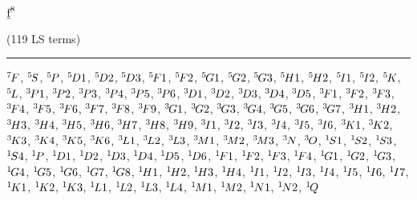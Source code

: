 \begin{mdframed}
\begin{center}
$\underbar{$\text{f}$}^{8}$

(119 LS terms)
\vspace{0.25cm}
\hrule
\vspace{0.25cm}

${}^{7}{\kern-0.1em}{F}$, ${}^{5}{\kern-0.1em}{S}$, ${}^{5}{\kern-0.1em}{P}$, ${}^{5}{\kern-0.1em}{D1}$, ${}^{5}{\kern-0.1em}{D2}$, ${}^{5}{\kern-0.1em}{D3}$, ${}^{5}{\kern-0.1em}{F1}$, ${}^{5}{\kern-0.1em}{F2}$, ${}^{5}{\kern-0.1em}{G1}$, ${}^{5}{\kern-0.1em}{G2}$, ${}^{5}{\kern-0.1em}{G3}$, ${}^{5}{\kern-0.1em}{H1}$, ${}^{5}{\kern-0.1em}{H2}$, ${}^{5}{\kern-0.1em}{I1}$, ${}^{5}{\kern-0.1em}{I2}$, ${}^{5}{\kern-0.1em}{K}$, ${}^{5}{\kern-0.1em}{L}$, ${}^{3}{\kern-0.1em}{P1}$, ${}^{3}{\kern-0.1em}{P2}$, ${}^{3}{\kern-0.1em}{P3}$, ${}^{3}{\kern-0.1em}{P4}$, ${}^{3}{\kern-0.1em}{P5}$, ${}^{3}{\kern-0.1em}{P6}$, ${}^{3}{\kern-0.1em}{D1}$, ${}^{3}{\kern-0.1em}{D2}$, ${}^{3}{\kern-0.1em}{D3}$, ${}^{3}{\kern-0.1em}{D4}$, ${}^{3}{\kern-0.1em}{D5}$, ${}^{3}{\kern-0.1em}{F1}$, ${}^{3}{\kern-0.1em}{F2}$, ${}^{3}{\kern-0.1em}{F3}$, ${}^{3}{\kern-0.1em}{F4}$, ${}^{3}{\kern-0.1em}{F5}$, ${}^{3}{\kern-0.1em}{F6}$, ${}^{3}{\kern-0.1em}{F7}$, ${}^{3}{\kern-0.1em}{F8}$, ${}^{3}{\kern-0.1em}{F9}$, ${}^{3}{\kern-0.1em}{G1}$, ${}^{3}{\kern-0.1em}{G2}$, ${}^{3}{\kern-0.1em}{G3}$, ${}^{3}{\kern-0.1em}{G4}$, ${}^{3}{\kern-0.1em}{G5}$, ${}^{3}{\kern-0.1em}{G6}$, ${}^{3}{\kern-0.1em}{G7}$, ${}^{3}{\kern-0.1em}{H1}$, ${}^{3}{\kern-0.1em}{H2}$, ${}^{3}{\kern-0.1em}{H3}$, ${}^{3}{\kern-0.1em}{H4}$, ${}^{3}{\kern-0.1em}{H5}$, ${}^{3}{\kern-0.1em}{H6}$, ${}^{3}{\kern-0.1em}{H7}$, ${}^{3}{\kern-0.1em}{H8}$, ${}^{3}{\kern-0.1em}{H9}$, ${}^{3}{\kern-0.1em}{I1}$, ${}^{3}{\kern-0.1em}{I2}$, ${}^{3}{\kern-0.1em}{I3}$, ${}^{3}{\kern-0.1em}{I4}$, ${}^{3}{\kern-0.1em}{I5}$, ${}^{3}{\kern-0.1em}{I6}$, ${}^{3}{\kern-0.1em}{K1}$, ${}^{3}{\kern-0.1em}{K2}$, ${}^{3}{\kern-0.1em}{K3}$, ${}^{3}{\kern-0.1em}{K4}$, ${}^{3}{\kern-0.1em}{K5}$, ${}^{3}{\kern-0.1em}{K6}$, ${}^{3}{\kern-0.1em}{L1}$, ${}^{3}{\kern-0.1em}{L2}$, ${}^{3}{\kern-0.1em}{L3}$, ${}^{3}{\kern-0.1em}{M1}$, ${}^{3}{\kern-0.1em}{M2}$, ${}^{3}{\kern-0.1em}{M3}$, ${}^{3}{\kern-0.1em}{N}$, ${}^{3}{\kern-0.1em}{O}$, ${}^{1}{\kern-0.1em}{S1}$, ${}^{1}{\kern-0.1em}{S2}$, ${}^{1}{\kern-0.1em}{S3}$, ${}^{1}{\kern-0.1em}{S4}$, ${}^{1}{\kern-0.1em}{P}$, ${}^{1}{\kern-0.1em}{D1}$, ${}^{1}{\kern-0.1em}{D2}$, ${}^{1}{\kern-0.1em}{D3}$, ${}^{1}{\kern-0.1em}{D4}$, ${}^{1}{\kern-0.1em}{D5}$, ${}^{1}{\kern-0.1em}{D6}$, ${}^{1}{\kern-0.1em}{F1}$, ${}^{1}{\kern-0.1em}{F2}$, ${}^{1}{\kern-0.1em}{F3}$, ${}^{1}{\kern-0.1em}{F4}$, ${}^{1}{\kern-0.1em}{G1}$, ${}^{1}{\kern-0.1em}{G2}$, ${}^{1}{\kern-0.1em}{G3}$, ${}^{1}{\kern-0.1em}{G4}$, ${}^{1}{\kern-0.1em}{G5}$, ${}^{1}{\kern-0.1em}{G6}$, ${}^{1}{\kern-0.1em}{G7}$, ${}^{1}{\kern-0.1em}{G8}$, ${}^{1}{\kern-0.1em}{H1}$, ${}^{1}{\kern-0.1em}{H2}$, ${}^{1}{\kern-0.1em}{H3}$, ${}^{1}{\kern-0.1em}{H4}$, ${}^{1}{\kern-0.1em}{I1}$, ${}^{1}{\kern-0.1em}{I2}$, ${}^{1}{\kern-0.1em}{I3}$, ${}^{1}{\kern-0.1em}{I4}$, ${}^{1}{\kern-0.1em}{I5}$, ${}^{1}{\kern-0.1em}{I6}$, ${}^{1}{\kern-0.1em}{I7}$, ${}^{1}{\kern-0.1em}{K1}$, ${}^{1}{\kern-0.1em}{K2}$, ${}^{1}{\kern-0.1em}{K3}$, ${}^{1}{\kern-0.1em}{L1}$, ${}^{1}{\kern-0.1em}{L2}$, ${}^{1}{\kern-0.1em}{L3}$, ${}^{1}{\kern-0.1em}{L4}$, ${}^{1}{\kern-0.1em}{M1}$, ${}^{1}{\kern-0.1em}{M2}$, ${}^{1}{\kern-0.1em}{N1}$, ${}^{1}{\kern-0.1em}{N2}$, ${}^{1}{\kern-0.1em}{Q}$
\end{center}
\end{mdframed}

